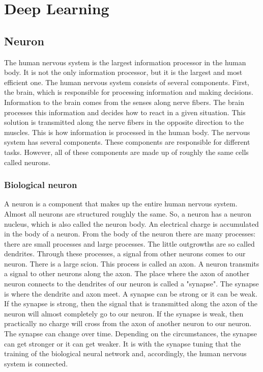 \chapter{Deep Learning}
\label{ch:deep_learning}

\section{Neuron}
The human nervous system is the largest information processor in the human body. It is not the only information processor, but it is the largest and most efficient one. The human nervous system consists of several components. First, the brain, which is responsible for processing information and making decisions. Information to the brain comes from the senses along nerve fibers. The brain processes this information and decides how to react in a given situation. This solution is transmitted along the nerve fibers in the opposite direction to the muscles. This is how information is processed in the human body. The nervous system has several components. These components are responsible for different tasks. However, all of these components are made up of roughly the same cells called neurons.

\subsection{Biological neuron}
A neuron is a component that makes up the entire human nervous system. Almost all neurons are structured roughly the same. 
So, a neuron has a neuron nucleus, which is also called the neuron body. An electrical charge is accumulated in the body of a neuron. From the body of the neuron there are many processes: there are small processes and large processes. The little outgrowths are so called dendrites. Through these processes, a signal from other neurons comes to our neuron. There is a large scion. This process is called an axon. A neuron transmits a signal to other neurons along the axon. The place where the axon of another neuron connects to the dendrites of our neuron is called a "synapse". The synapse is where the dendrite and axon meet. A synapse can be strong or it can be weak. If the synapse is strong, then the signal that is transmitted along the axon of the neuron will almost completely go to our neuron. If the synapse is weak, then practically no charge will cross from the axon of another neuron to our neuron. The synapse can change over time. Depending on the circumstances, the synapse can get stronger or it can get weaker. It is with the synapse tuning that the training of the biological neural network and, accordingly, the human nervous system is connected.

